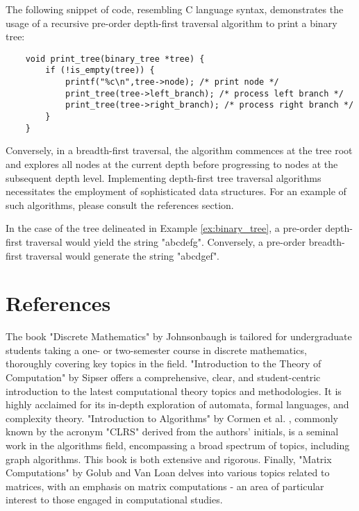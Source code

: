 The following snippet of code, resembling C language syntax, demonstrates the usage of a recursive pre-order depth-first traversal algorithm to print a binary tree:

\begin{verbatim}
    void print_tree(binary_tree *tree) {
        if (!is_empty(tree)) {
            printf("%c\n",tree->node); /* print node */
            print_tree(tree->left_branch); /* process left branch */
            print_tree(tree->right_branch); /* process right branch */
        }
    }
\end{verbatim}

Conversely, in a breadth-first traversal, the algorithm commences at the tree root and explores all nodes at the current depth before progressing to nodes at the subsequent depth level. Implementing depth-first tree traversal algorithms necessitates the employment of sophisticated data structures. For an example of such algorithms, please consult the references section.

\begin{example}
In the case of the tree delineated in Example \ref{ex:binary_tree}, a pre-order depth-first traversal would yield the string "abcdefg". Conversely, a pre-order breadth-first traversal would generate the string "abcdgef".
\end{example}

%
%

\section*{References}

The book "Discrete Mathematics" by Johnsonbaugh \cite{johnsonbaugh2009discrete} is tailored for undergraduate students taking a one- or two-semester course in discrete mathematics, thoroughly covering key topics in the field. "Introduction to the Theory of Computation" by Sipser \cite{sipser2012introduction} offers a comprehensive, clear, and student-centric introduction to the latest computational theory topics and methodologies. It is highly acclaimed for its in-depth exploration of automata, formal languages, and complexity theory. "Introduction to Algorithms" by Cormen et al. \cite{cormen1990introduction}, commonly known by the acronym "CLRS" derived from the authors' initials, is a seminal work in the algorithms field, encompassing a broad spectrum of topics, including graph algorithms. This book is both extensive and rigorous. Finally, "Matrix Computations" by Golub and Van Loan \cite{golub2013matrix} delves into various topics related to matrices, with an emphasis on matrix computations - an area of particular interest to those engaged in computational studies.






